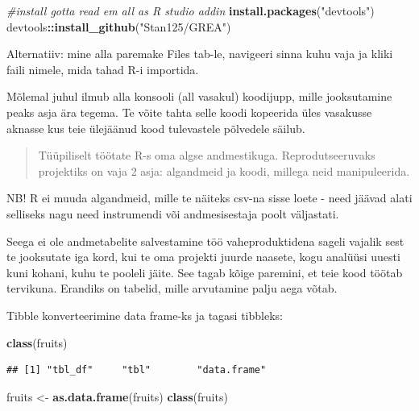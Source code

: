 \documentclass[]{book}
\newenvironment{Shaded}{\begin{snugshade}}{\end{snugshade}}
\newcommand{\KeywordTok}[1]{\textcolor[rgb]{0.13,0.29,0.53}{\textbf{#1}}}
\newcommand{\StringTok}[1]{\textcolor[rgb]{0.31,0.60,0.02}{#1}}
\newcommand{\CommentTok}[1]{\textcolor[rgb]{0.56,0.35,0.01}{\textit{#1}}}
\newcommand{\OperatorTok}[1]{\textcolor[rgb]{0.81,0.36,0.00}{\textbf{#1}}}
\newcommand{\NormalTok}[1]{#1}
\begin{document}
\begin{Shaded}
\begin{Highlighting}[]
\CommentTok{#install gotta read em all as R studio addin}
\KeywordTok{install.packages}\NormalTok{(}\StringTok{"devtools"}\NormalTok{)}
\NormalTok{devtools}\OperatorTok{::}\KeywordTok{install_github}\NormalTok{(}\StringTok{"Stan125/GREA"}\NormalTok{)}
\end{Highlighting}
\end{Shaded}

Alternatiiv: mine alla paremake Files tab-le, navigeeri sinna kuhu vaja
ja kliki faili nimele, mida tahad R-i importida.

Mõlemal juhul ilmub alla konsooli (all vasakul) koodijupp, mille
jooksutamine peaks asja ära tegema. Te võite tahta selle koodi kopeerida
üles vasakusse aknasse kus teie ülejäänud kood tulevastele põlvedele
säilub.

\begin{quote}
Tüüpiliselt töötate R-s oma algse andmestikuga. Reprodutseeruvaks
projektiks on vaja 2 asja: algandmeid ja koodi, millega neid
manipuleerida.
\end{quote}

NB! R ei muuda algandmeid, mille te näiteks csv-na sisse loete - need
jäävad alati selliseks nagu need instrumendi või andmesisestaja poolt
väljastati.

Seega ei ole andmetabelite salvestamine töö vaheproduktidena sageli
vajalik sest te jooksutate iga kord, kui te oma projekti juurde naasete,
kogu analüüsi uuesti kuni kohani, kuhu te pooleli jäite. See tagab kõige
paremini, et teie kood töötab tervikuna. Erandiks on tabelid, mille
arvutamine palju aega võtab.

Tibble konverteerimine data frame-ks ja tagasi tibbleks:

\begin{Shaded}
\begin{Highlighting}[]
\KeywordTok{class}\NormalTok{(fruits)}
\end{Highlighting}
\end{Shaded}

\begin{verbatim}
## [1] "tbl_df"     "tbl"        "data.frame"
\end{verbatim}

\begin{Shaded}
\begin{Highlighting}[]
\NormalTok{fruits <-}\StringTok{ }\KeywordTok{as.data.frame}\NormalTok{(fruits)}
\KeywordTok{class}\NormalTok{(fruits)}
\end{Highlighting}
\end{Shaded}
\end{document}
